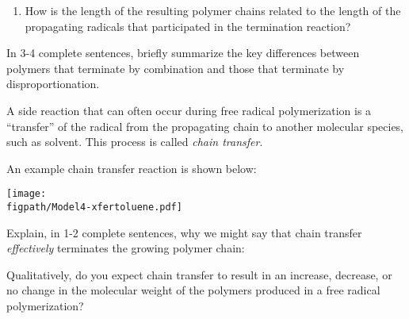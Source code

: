 \begin{activity}
\begin{ctqs}
\begin{enumerate}
			\item How is the length of the resulting polymer chains related to the length of the propagating radicals that participated in the termination reaction?
	
				\begin{solution}[0.5in]
				\end{solution}
				
		\end{enumerate}
	
	\question In 3-4 complete sentences, briefly summarize the key differences between polymers that terminate by combination and those that terminate by disproportionation.
	
				\begin{solution}[3in]
				\end{solution}
	

\end{ctqs}

		

\begin{model}
\label{\labelbase:mdl:FRPxferchem}

	A side reaction that can often occur during free radical polymerization is a ``transfer'' of the radical from the propagating chain to another molecular species, such as solvent.  This process is called \emph{chain transfer}.
	
	An example chain transfer reaction is shown below:
	
			\centerline{\texttt{[image: \\figpath/Model4-xfertoluene.pdf]}}
	
\end{model}

\begin{ctqs}
	\question Explain, in 1-2 complete sentences, why we might say that chain transfer \emph{effectively} terminates the growing polymer chain:
	
		\begin{solution}[1.5in]
		\end{solution}
	
	\question Qualitatively, do you expect chain transfer to result in an increase, decrease, or no change in the molecular weight of the polymers produced in a free radical polymerization?
	
		\begin{solution}[1.5in]
		\end{solution}
		
\end{ctqs}



\end{activity}
